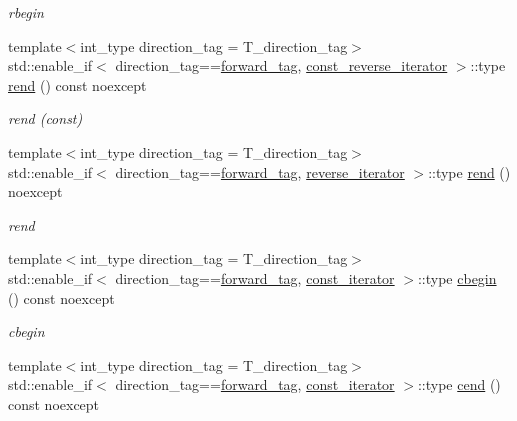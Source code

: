 \begin{DoxyCompactItemize}
\begin{DoxyCompactList}\small\item\em rbegin \end{DoxyCompactList}\item 
{\footnotesize template$<$int\+\_\+type direction\+\_\+tag = T\+\_\+direction\+\_\+tag$>$ }\\std\+::enable\+\_\+if$<$ direction\+\_\+tag==\hyperlink{namespaceIceBRG_a3f2c2517005b9902e3eb97894b072f91ac4e94566c20918ca2fe2c7ccdfdec928}{forward\+\_\+tag}, \hyperlink{classIceBRG_1_1labeled__array__vecs_aefecf82bcd5d24b2c6fc29b4f8930054}{const\+\_\+reverse\+\_\+iterator} $>$\+::type \hyperlink{classIceBRG_1_1labeled__array__vecs_a481e3df0f50b71ed4470b7cc4acecf6c}{rend} () const  noexcept
\begin{DoxyCompactList}\small\item\em rend (const) \end{DoxyCompactList}\item 
{\footnotesize template$<$int\+\_\+type direction\+\_\+tag = T\+\_\+direction\+\_\+tag$>$ }\\std\+::enable\+\_\+if$<$ direction\+\_\+tag==\hyperlink{namespaceIceBRG_a3f2c2517005b9902e3eb97894b072f91ac4e94566c20918ca2fe2c7ccdfdec928}{forward\+\_\+tag}, \hyperlink{classIceBRG_1_1labeled__array__vecs_ab3d90428e6ba03e8a3bcb3b44629e3f5}{reverse\+\_\+iterator} $>$\+::type \hyperlink{classIceBRG_1_1labeled__array__vecs_af0400571b7c32060ac2a48cfb55bcd53}{rend} () noexcept
\begin{DoxyCompactList}\small\item\em rend \end{DoxyCompactList}\item 
{\footnotesize template$<$int\+\_\+type direction\+\_\+tag = T\+\_\+direction\+\_\+tag$>$ }\\std\+::enable\+\_\+if$<$ direction\+\_\+tag==\hyperlink{namespaceIceBRG_a3f2c2517005b9902e3eb97894b072f91ac4e94566c20918ca2fe2c7ccdfdec928}{forward\+\_\+tag}, \hyperlink{classIceBRG_1_1labeled__array__vecs_a6003abed56d6f931ce74524cda329972}{const\+\_\+iterator} $>$\+::type \hyperlink{classIceBRG_1_1labeled__array__vecs_a0fd935fbb80e4929ecb7c90074eaa076}{cbegin} () const  noexcept
\begin{DoxyCompactList}\small\item\em cbegin \end{DoxyCompactList}\item 
{\footnotesize template$<$int\+\_\+type direction\+\_\+tag = T\+\_\+direction\+\_\+tag$>$ }\\std\+::enable\+\_\+if$<$ direction\+\_\+tag==\hyperlink{namespaceIceBRG_a3f2c2517005b9902e3eb97894b072f91ac4e94566c20918ca2fe2c7ccdfdec928}{forward\+\_\+tag}, \hyperlink{classIceBRG_1_1labeled__array__vecs_a6003abed56d6f931ce74524cda329972}{const\+\_\+iterator} $>$\+::type \hyperlink{classIceBRG_1_1labeled__array__vecs_aaa11a779bcf4aed83b89832566096646}{cend} () const  noexcept

\end{DoxyCompactItemize}
